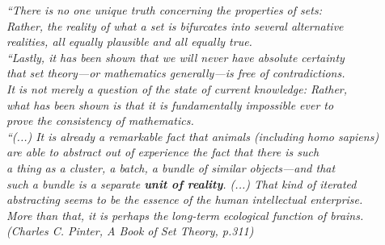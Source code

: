 \documentclass[
12pt,				%
openright,			%
oneside,			%
a4paper,			%
brazil,				%
english,			%
]{abntex2}
\begin{document}
\begin{epigrafe}
    \vspace*{\fill}
	\begin{flushright}
          \textit{``There is no one unique truth concerning the properties of
            sets:\\
            Rather, the reality of what a set is bifurcates into several alternative\\
            realities, all equally plausible and all equally true.\\
            ``Lastly, it has been shown that we will never have absolute certainty\\
            that set theory—or mathematics generally—is free of contradictions.\\
            It is not merely a question of the state of current knowledge: Rather,\\
            what has been shown is that it is fundamentally impossible ever to\\
            prove the consistency of mathematics.\\
            ``(...) It is already a remarkable fact that animals (including homo sapiens)\\
            are able to abstract out of experience the fact that there is such\\
            a thing as a cluster, a batch, a bundle of similar objects—and that\\
            such a bundle is a separate \textbf{unit of reality}. (...) That kind of iterated\\
            abstracting seems to be the essence of the human intellectual enterprise.\\
            More than that, it is perhaps the long-term ecological function of brains.\\
            (Charles C. Pinter, A Book of Set Theory, p.311)}
	\end{flushright}
\end{epigrafe}

\end{document}
